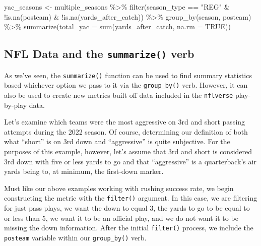 \documentclass[
  letterpaper,
]{krantz}
\newenvironment{Shaded}{\begin{snugshade}}{\end{snugshade}}
\newcommand{\AttributeTok}[1]{\textcolor[rgb]{0.40,0.45,0.13}{#1}}
\newcommand{\ConstantTok}[1]{\textcolor[rgb]{0.56,0.35,0.01}{#1}}
\newcommand{\FunctionTok}[1]{\textcolor[rgb]{0.28,0.35,0.67}{#1}}
\newcommand{\NormalTok}[1]{\textcolor[rgb]{0.00,0.23,0.31}{#1}}
\newcommand{\OtherTok}[1]{\textcolor[rgb]{0.00,0.23,0.31}{#1}}
\newcommand{\SpecialCharTok}[1]{\textcolor[rgb]{0.37,0.37,0.37}{#1}}
\newcommand{\StringTok}[1]{\textcolor[rgb]{0.13,0.47,0.30}{#1}}
\begin{document}
\begin{Shaded}
\begin{Highlighting}[]
\NormalTok{yac\_seasons }\OtherTok{\textless{}{-}}\NormalTok{ multiple\_seasons }\SpecialCharTok{\%\textgreater{}\%}
  \FunctionTok{filter}\NormalTok{(season\_type }\SpecialCharTok{==} \StringTok{"REG"} \SpecialCharTok{\&}
           \SpecialCharTok{!}\FunctionTok{is.na}\NormalTok{(posteam) }\SpecialCharTok{\&}
           \SpecialCharTok{!}\FunctionTok{is.na}\NormalTok{(yards\_after\_catch)) }\SpecialCharTok{\%\textgreater{}\%}
  \FunctionTok{group\_by}\NormalTok{(season, posteam) }\SpecialCharTok{\%\textgreater{}\%}
  \FunctionTok{summarize}\NormalTok{(}\AttributeTok{total\_yac =} \FunctionTok{sum}\NormalTok{(yards\_after\_catch, }\AttributeTok{na.rm =} \ConstantTok{TRUE}\NormalTok{))}
\end{Highlighting}
\end{Shaded}

\hypertarget{nfl-data-and-the-summarize-verb}{%
\subsection{\texorpdfstring{NFL Data and the \texttt{summarize()}
verb}{NFL Data and the summarize() verb}}\label{nfl-data-and-the-summarize-verb}}

As we've seen, the \texttt{summarize()} function can be used to find
summary statistics based whichever option we pass to it via the
\texttt{group\_by()} verb. However, it can also be used to create new
metrics built off data included in the \texttt{nflverse} play-by-play
data.

Let's examine which teams were the most aggressive on 3rd and short
passing attempts during the 2022 season. Of course, determining our
definition of both what ``short'' is on 3rd down and ``aggressive'' is
quite subjective. For the purposes of this example, however, let's
assume that 3rd and short is considered 3rd down with five or less yards
to go and that ``aggressive'' is a quarterback's air yards being to, at
minimum, the first-down marker.

Must like our above examples working with rushing success rate, we begin
constructing the metric with the \texttt{filter()} argument. In this
case, we are filtering for just pass plays, we want the down to equal 3,
the yards to go to be equal to or less than 5, we want it to be an
official play, and we do not want it to be missing the down information.
After the initial \texttt{filter()} process, we include the
\texttt{posteam} variable within our \texttt{group\_by()} verb.
\end{document}
